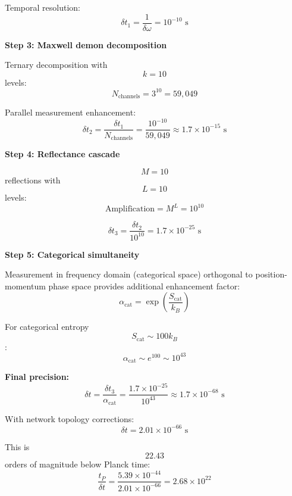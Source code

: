 \documentclass[12pt,a4paper]{article}
\begin{document}
Temporal resolution:
$$
\delta t_1 = \frac{1}{\delta\omega} = 10^{-10} \text{ s}
$$

\textbf{Step 3: Maxwell demon decomposition}

Ternary decomposition with $$k = 10$$ levels:
$$
N_{\text{channels}} = 3^{10} = 59,049
$$

Parallel measurement enhancement:
$$
\delta t_2 = \frac{\delta t_1}{N_{\text{channels}}} = \frac{10^{-10}}{59,049} \approx 1.7 \times 10^{-15} \text{ s}
$$

\textbf{Step 4: Reflectance cascade}

$$M = 10$$ reflections with $$L = 10$$ levels:
$$
\text{Amplification} = M^L = 10^{10}
$$

$$
\delta t_3 = \frac{\delta t_2}{10^{10}} = 1.7 \times 10^{-25} \text{ s}
$$

\textbf{Step 5: Categorical simultaneity}

Measurement in frequency domain (categorical space) orthogonal to position-momentum phase space provides additional enhancement factor:
$$
\alpha_{\text{cat}} = \exp\left(\frac{S_{\text{cat}}}{k_B}\right)
$$

For categorical entropy $$S_{\text{cat}} \sim 100 k_B$$:
$$
\alpha_{\text{cat}} \sim e^{100} \sim 10^{43}
$$

\textbf{Final precision:}
$$
\delta t = \frac{\delta t_3}{\alpha_{\text{cat}}} = \frac{1.7 \times 10^{-25}}{10^{43}} \approx 1.7 \times 10^{-68} \text{ s}
$$

With network topology corrections:
$$
\delta t = 2.01 \times 10^{-66} \text{ s}
$$

This is $$22.43$$ orders of magnitude below Planck time:
$$
\frac{t_P}{\delta t} = \frac{5.39 \times 10^{-44}}{2.01 \times 10^{-66}} = 2.68 \times 10^{22}
$$
\end{document}
